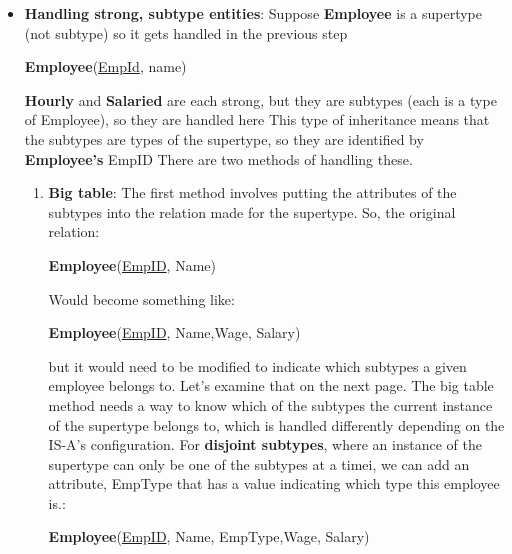 \documentclass{report}
\begin{document}
\begin{itemize}
        \item \textbf{Handling strong, subtype entities}: Suppose
            \bigbreak \noindent 
            \bigbreak \noindent 
            \textbf{Employee} is a supertype (not subtype) so it gets handled in the previous step
            \begin{center}
                \textbf{Employee}(\underline{EmpId}, name)
            \end{center}
            \bigbreak \noindent 
            \textbf{Hourly} and \textbf{Salaried} are each strong, but they are subtypes (each is a type of Employee), so they are handled here
            \bigbreak \noindent 
            This type of inheritance means that the subtypes are types of the supertype, so they are identified by \textbf{Employee’s} EmpID
            \bigbreak \noindent 
            There are two methods of handling these.
            \begin{enumerate}
                \item \textbf{Big table}: The first method involves putting the attributes of the subtypes into the relation made for the supertype. So, the original relation:
                    \begin{center}
                        \textbf{Employee}(\underline{EmpID}, Name)
                    \end{center}
                    Would become something like:
                    \begin{center}
                        \textbf{Employee}(\underline{EmpID}, Name,Wage, Salary)
                    \end{center}
                    but it would need to be modified to indicate which subtypes a given employee belongs to. Let’s examine that on the next page.
                    \bigbreak \noindent 
                    The big table method needs a way to know which of the subtypes the current instance of the supertype belongs to, which is handled differently depending on the IS-A’s configuration.
                    \bigbreak \noindent 
                    For \textbf{disjoint subtypes}, where an instance of the supertype can only be one of the subtypes at a timei, we can add an attribute, EmpType that has a value indicating which type this employee is.:
                    \begin{center}
                        \textbf{Employee}(\underline{EmpID}, Name, EmpType,Wage, Salary)
                    \end{center}

\end{enumerate}
\end{itemize}
\end{document}
